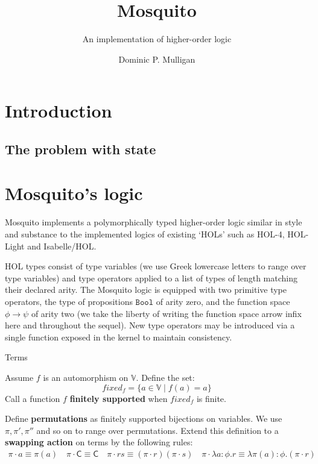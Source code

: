 \documentclass{llncs}
\author{Dominic P. Mulligan}
\title{Mosquito}
\subtitle{An implementation of higher-order logic}
\institute{Computer Laboratory, University of Cambridge}
\newcommand{\act}{\cdot}
\newcommand{\deffont}[1]{\textbf{#1}}
\newcommand{\lam}[1]{\lambda{#1}.}
\newcommand{\tf}[1]{\mathsf{#1}}
\begin{document}
\maketitle

\begin{abstract}
\end{abstract}

\section{Introduction}
\label{sect.introduction}

\subsection{The problem with state}
\label{subsect.problem.with.state}

\section{Mosquito's logic}
\label{sect.mosquito.logic}

Mosquito implements a polymorphically typed higher-order logic similar in style and substance to the implemented logics of existing `HOLs' such as HOL-4, HOL-Light and Isabelle/HOL.

HOL types consist of type variables (we use Greek lowercase letters to range over type variables) and type operators applied to a list of types of length matching their declared arity.
The Mosquito logic is equipped with two primitive type operators, the type of propositions $\mathtt{Bool}$ of arity zero, and the function space $\phi \rightarrow \psi$ of arity two (we take the liberty of writing the function space arrow infix here and throughout the sequel).
New type operators may be introduced via a single function exposed in the kernel to maintain consistency.

Terms

\begin{definition}
\label{defn.finite.support}
Assume $f$ is an automorphism on $\mathbb{V}$.
Define the set:
\begin{displaymath}
fixed_f = \{ a \in \mathbb{V} \mid f(a) = a \}
\end{displaymath}
Call a function $f$ \deffont{finitely supported} when $fixed_f$ is finite.
\end{definition}

\begin{definition}
\label{defn.swapping.action}
Define \deffont{permutations} as finitely supported bijections on variables.
We use $\pi, \pi', \pi''$ and so on to range over permutations.
Extend this definition to a \deffont{swapping action} on terms by the following rules:
\begin{gather*}
\pi \act a \equiv \pi(a) \quad \pi \act \tf{C} \equiv \tf{C} \quad \pi \act rs \equiv (\pi \act r)(\pi \act s) \quad \pi \act \lam{a{:}\phi}r \equiv \lam{\pi(a){:}\phi}(\pi \act r)
\end{gather*}
\end{definition}
\end{document}
